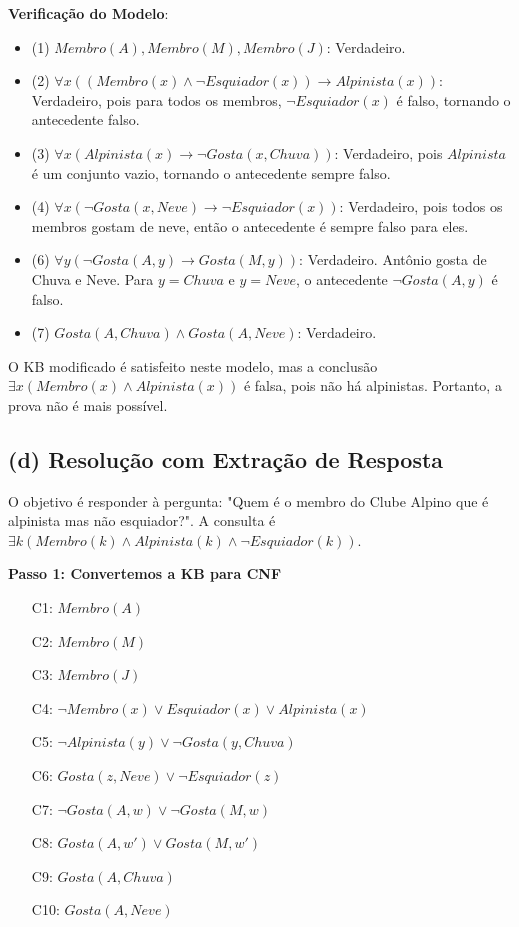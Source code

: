 \documentclass{article}
\begin{document}
\textbf{Verificação do Modelo}:
\begin{itemize}
    \item (1) $Membro(A), Membro(M), Membro(J)$: Verdadeiro.
    \item (2) $\forall x ((Membro(x) \wedge \neg Esquiador(x)) \rightarrow Alpinista(x))$: Verdadeiro, pois para todos os membros, $\neg Esquiador(x)$ é falso, tornando o antecedente falso.
    \item (3) $\forall x (Alpinista(x) \rightarrow \neg Gosta(x, Chuva))$: Verdadeiro, pois $Alpinista$ é um conjunto vazio, tornando o antecedente sempre falso.
    \item (4) $\forall x (\neg Gosta(x, Neve) \rightarrow \neg Esquiador(x))$: Verdadeiro, pois todos os membros gostam de neve, então o antecedente é sempre falso para eles.
    \item (6) $\forall y (\neg Gosta(A, y) \rightarrow Gosta(M, y))$: Verdadeiro. Antônio gosta de Chuva e Neve. Para $y=Chuva$ e $y=Neve$, o antecedente $\neg Gosta(A,y)$ é falso.
    \item (7) $Gosta(A, Chuva) \wedge Gosta(A, Neve)$: Verdadeiro.
\end{itemize}
O KB modificado é satisfeito neste modelo, mas a conclusão $\exists x (Membro(x) \wedge Alpinista(x))$ é falsa, pois não há alpinistas. Portanto, a prova não é mais possível.

\subsection*{(d) Resolução com Extração de Resposta}
O objetivo é responder à pergunta: "Quem é o membro do Clube Alpino que é alpinista mas não esquiador?". A consulta é $\exists k (Membro(k) \wedge Alpinista(k) \wedge \neg Esquiador(k))$.

\textbf{Passo 1: Convertemos a KB para CNF}
\begin{itemize}
    \item[C1:] $Membro(A)$
    \item[C2:] $Membro(M)$
    \item[C3:] $Membro(J)$
    \item[C4:] $\neg Membro(x) \vee Esquiador(x) \vee Alpinista(x)$
    \item[C5:] $\neg Alpinista(y) \vee \neg Gosta(y, Chuva)$
    \item[C6:] $Gosta(z, Neve) \vee \neg Esquiador(z)$
    \item[C7:] $\neg Gosta(A, w) \vee \neg Gosta(M, w)$
    \item[C8:] $Gosta(A, w') \vee Gosta(M, w')$
    \item[C9:] $Gosta(A, Chuva)$
    \item[C10:] $Gosta(A, Neve)$
\end{itemize}
\end{document}
